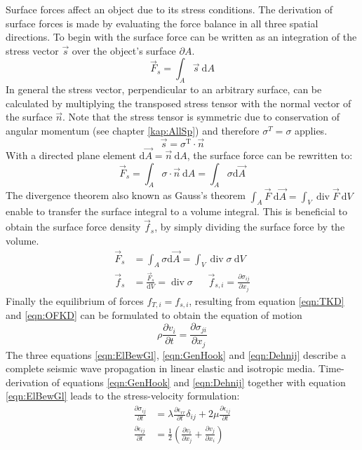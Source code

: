 \documentclass[pdftex,a4paper,parskip,listof=totoc,bibliography=totoc,onehalfspacing,12pt]{scrreprt}
\begin{document}
Surface forces affect an object due to its stress conditions. The derivation of surface forces is made by evaluating the force balance in all three spatial directions. To begin with the surface force can be written as an integration of the stress vector $\vec{s}$ over the object's surface $\partial A$.
\begin{equation}
	\vec{F}_s = \int_A \vec{s} ~\mathrm{d}A
\end{equation}
In general the stress vector, perpendicular to an arbitrary surface, can be calculated by multiplying the transposed stress tensor with the normal vector of the surface $\vec{n}$. Note that the stress tensor is symmetric due to conservation of angular momentum (see chapter \ref{kap:AllSp}) and therefore $\sigma^T = \sigma$ applies.
\begin{equation}
	\vec{s} = \sigma^\mathrm{T} \cdot\vec{n}
\end{equation}
With a directed plane element $\mathrm{d}\vec{A} = \vec{n} ~\mathrm{d}A$, the surface force can be rewritten to: 
\begin{equation}
	\vec{F}_s = \int_A \sigma \cdot\vec{n} ~\mathrm{d}A = \int_A \sigma \mathrm{d}\vec{A} 
\end{equation}
The divergence theorem also known as Gauss's theorem $\int_A \vec{F}~\mathrm{d}\vec{A} = \int_V \operatorname{div} \vec{F} ~\mathrm{d}V$ enable to transfer the surface integral to a volume integral. This is beneficial to obtain the surface force density $\vec{f}_{s}$, by simply dividing the surface force by the volume. 
\begin{align}
	\vec{F}_s &= \int_A \sigma \mathrm{d}\vec{A} = \int_V \operatorname{div} \sigma ~\mathrm{d}V\\
	\vec{f}_s &= \frac{\vec{F}_s}{\mathrm{d}V} = \operatorname{div} \sigma~~~~~~~\vec{f}_{s,i} = \frac{\partial \sigma_{ij}}{\partial x_j}\label{eqn:OFKD}
\end{align}
Finally the equilibrium of forces $f_{T,i} = f_{s,i}$, resulting from equation \ref{eqn:TKD} and \ref{eqn:OFKD} can be formulated to obtain the equation of motion 
\begin{equation}
	\rho \frac{\partial v_i}{\partial t} =  \frac{\partial \sigma_{ji}}{\partial x_j}\label{eqn:ElBewGl}
\end{equation}
The three equations \ref{eqn:ElBewGl}, \ref{eqn:GenHook} and \ref{eqn:Dehnij} describe a complete seismic wave propagation in linear elastic and isotropic media. Time-derivation of equations \ref{eqn:GenHook} and \ref{eqn:Dehnij} together with equation \ref{eqn:ElBewGl} leads to the stress-velocity formulation:
\begin{align}
	\frac{\partial\sigma_{ij}}{\partial t} &= \lambda \frac{\partial \epsilon_{rr}}{\partial t} \delta_{ij} + 2 \mu \frac{\partial \epsilon_{ij}}{\partial t}\label{eqn:GenHookdt}\\
	\frac{\partial\epsilon_{ij}}{\partial t} &= \frac{1}{2} \left( \frac{\partial v_i}{\partial x_j} + \frac{\partial v_j}{\partial x_i} \right)\label{eqn:Dehnijdt}
\end{align}
\cleardoublepage
\end{document}
